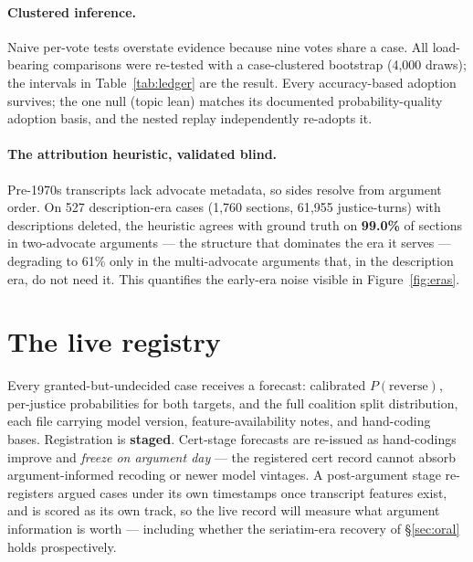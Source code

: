 \documentclass[11pt]{article}
\begin{document}
\paragraph{Clustered inference.} Naive per-vote tests overstate evidence because
nine votes share a case. All load-bearing comparisons were re-tested with a
case-clustered bootstrap (4{,}000 draws); the intervals in
Table~\ref{tab:ledger} are the result. Every accuracy-based adoption survives;
the one null (topic lean) matches its documented probability-quality adoption
basis, and the nested replay independently re-adopts it.

\paragraph{The attribution heuristic, validated blind.} Pre-1970s transcripts
lack advocate metadata, so sides resolve from argument order. On 527
description-era cases (1{,}760 sections, 61{,}955 justice-turns) with
descriptions deleted, the heuristic agrees with ground truth on \textbf{99.0\%}
of sections in two-advocate arguments --- the structure that dominates the era
it serves --- degrading to 61\% only in the multi-advocate arguments that, in
the description era, do not need it. This quantifies the early-era noise
visible in Figure~\ref{fig:eras}.

\section{The live registry}\label{sec:registry}

Every granted-but-undecided case receives a forecast: calibrated
$P(\text{reverse})$, per-justice probabilities for both targets, and the full
coalition split distribution, each file carrying model version,
feature-availability notes, and hand-coding bases. Registration is
\textbf{staged}. Cert-stage forecasts are re-issued as hand-codings improve and
\emph{freeze on argument day} --- the registered cert record cannot absorb
argument-informed recoding or newer model vintages. A post-argument stage
re-registers argued cases under its own timestamps once transcript features
exist, and is scored as its own track, so the live record will measure what
argument information is worth --- including whether the seriatim-era recovery
of \S\ref{sec:oral} holds prospectively.
\end{document}

